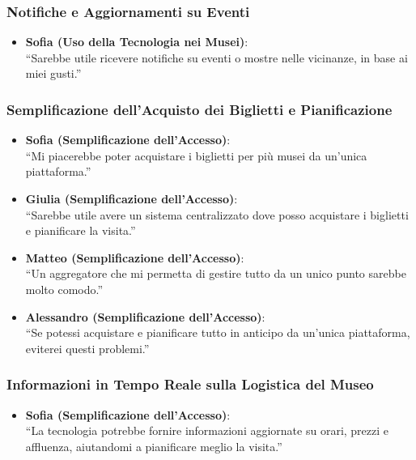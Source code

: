 \documentclass{article}
\begin{document}
\subsubsection{Notifiche e Aggiornamenti su Eventi}

\begin{itemize}
    \item \textbf{Sofia (Uso della Tecnologia nei Musei)}:\\
    ``Sarebbe utile ricevere notifiche su eventi o mostre nelle vicinanze, in base ai miei gusti.''
\end{itemize}

\subsubsection{Semplificazione dell'Acquisto dei Biglietti e Pianificazione}

\begin{itemize}
    \item \textbf{Sofia (Semplificazione dell'Accesso)}:\\
    ``Mi piacerebbe poter acquistare i biglietti per più musei da un'unica piattaforma.''
    \item \textbf{Giulia (Semplificazione dell'Accesso)}:\\
    ``Sarebbe utile avere un sistema centralizzato dove posso acquistare i biglietti e pianificare la visita.''
    \item \textbf{Matteo (Semplificazione dell'Accesso)}:\\
    ``Un aggregatore che mi permetta di gestire tutto da un unico punto sarebbe molto comodo.''
    \item \textbf{Alessandro (Semplificazione dell'Accesso)}:\\
    ``Se potessi acquistare e pianificare tutto in anticipo da un'unica piattaforma, eviterei questi problemi.''
\end{itemize}

\subsubsection{Informazioni in Tempo Reale sulla Logistica del Museo}

\begin{itemize}
    \item \textbf{Sofia (Semplificazione dell'Accesso)}:\\
    ``La tecnologia potrebbe fornire informazioni aggiornate su orari, prezzi e affluenza, aiutandomi a pianificare meglio la visita.''
\end{itemize}
\end{document}
